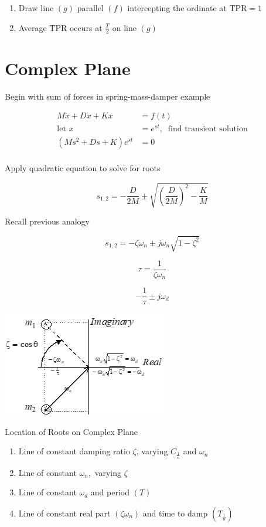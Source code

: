 \documentclass[
]{book}
\providecommand{\tightlist}{%
  \setlength{\itemsep}{0pt}\setlength{\parskip}{0pt}}
\begin{document}
\begin{enumerate}
\def\labelenumi{\arabic{enumi}.}
\setcounter{enumi}{2}
\tightlist
\item
  Draw line \(\left( g \right)\) parallel \(\left( f \right)\) intercepting the ordinate at \(\mathrm{TPR} = 1\)
\item
  Average \(\mathrm{TPR}\) occurs at \(\frac{T}{2}\) on line \(\left( g \right)\)
\end{enumerate}

\hypertarget{complex-plane}{%
\section{Complex Plane}\label{complex-plane}}

Begin with sum of forces in spring-mass-damper example

\begin{align}
  M \ddot{x} + D \dot{x} + K x &= f \left( t \right) \\
  \text{let } x &= e^{st}, \;\; \text{find transient solution} \\
  \left( Ms^2 + Ds + K \right) e^{st} &= 0  \\
\end{align}

Apply quadratic equation to solve for roots

\[
  s_{1,2} = -\frac{D}{2M} \pm \sqrt{ \left( \frac{D}{2M} \right)^2 - \frac{K}{M} }
\]

Recall previous analogy

\[
  s_{1,2} = -\zeta \omega_n \pm j \omega_n \sqrt{ 1 - \zeta^2 }
\]

\[
  \tau = \frac{1}{\zeta \omega_n}
\]

\[
  - \frac{1}{\tau} \pm j \omega_d
\]

\includegraphics{media/08/image104.png}

Location of Roots on Complex Plane

\begin{enumerate}
\def\labelenumi{\arabic{enumi}.}
\tightlist
\item
  Line of constant damping ratio \(\zeta\), varying \(C_{\frac{1}{n}}\) and \(\omega_n\)
\item
  Line of constant \(\omega_n\),~varying \(\zeta\)
\item
  Line of constant \(\omega_d\) and period \(\left( T \right)\)
\item
  Line of constant real part \(\left( \zeta\omega_n \right)\) and time to damp \(\left( T_{\frac{1}{n}} \right)\)
\end{enumerate}
\end{document}
